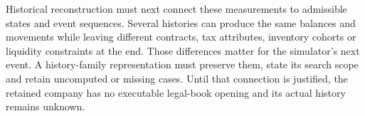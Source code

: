 Historical reconstruction must next connect these measurements to admissible
states and event sequences. Several histories can produce the same balances
and movements while leaving different contracts, tax attributes, inventory
cohorts or liquidity constraints at the end. Those differences matter for the
simulator's next event. A history-family representation must preserve them,
state its search scope and retain uncomputed or missing cases. Until that
connection is justified, the retained company has no executable legal-book
opening and its actual history remains unknown.

